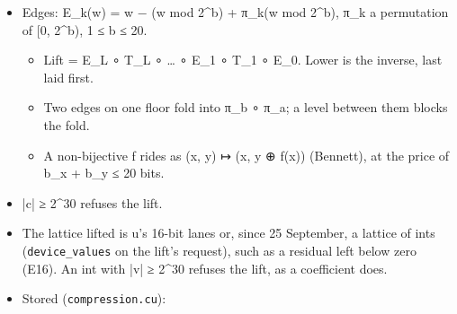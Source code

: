 \begin{itemize}
\begin{itemize}
\item target\_\allowbreak{}a ← target\_\allowbreak{}a + σ·⌊(r + Σ\_\allowbreak{}k w\_\allowbreak{}k·other\_\allowbreak{}\{a+o\_\allowbreak{}k\}) / 2\textasciicircum{}s⌋, σ = ±1, an index past either end of \texttt{other} taken at that end;
\item a ruleset R = (ρ\_\allowbreak{}1, …, ρ\_\allowbreak{}m) runs its steps in order along every line of every level. T⁻¹ runs them last first with each σ turned. A step moves only its target, reading only the other band, and every ruleset is therefore invertible exactly, whatever its weights;
\item the kernels' 5/3 is ρ\_\allowbreak{}1 = (H, σ = −1, o = (0, 1), w = (1, 1), r = 0, s = 1), then ρ\_\allowbreak{}2 = (L, σ = +1, o = (−1, 0), w = (1, 1), r = 2, s = 2);
\item two rulesets the kernels do not run are the S transform, (H, −1, (0), (1), 0, 0) then (L, +1, (0), (1), 0, 1), and a four-tap predict, (H, −1, (−1, 0, 1, 2), (−1, 9, 9, −1), 8, 4), with the 5/3's update;
\item on the record machine a weight other than ±1 is a PRODUCT by a constant, which keymath's linear forms carry (A16), and each constant is one step, laid where it is first read.
\end{itemize}
\item Edges: E\_\allowbreak{}k(w) = w − (w mod 2\textasciicircum{}b) + π\_\allowbreak{}k(w mod 2\textasciicircum{}b), π\_\allowbreak{}k a permutation of [0, 2\textasciicircum{}b), 1 ≤ b ≤ 20.

\begin{itemize}
\item Lift = E\_\allowbreak{}L ∘ T\_\allowbreak{}L ∘ … ∘ E\_\allowbreak{}1 ∘ T\_\allowbreak{}1 ∘ E\_\allowbreak{}0. Lower is the inverse, last laid first.
\item Two edges on one floor fold into π\_\allowbreak{}b ∘ π\_\allowbreak{}a; a level between them blocks the fold.
\item A non-bijective f rides as (x, y) ↦ (x, y ⊕ f(x)) (Bennett), at the price of b\_\allowbreak{}x + b\_\allowbreak{}y ≤ 20 bits.
\end{itemize}
\item |c| ≥ 2\textasciicircum{}30 refuses the lift.
\item The lattice lifted is u's 16-bit lanes or, since 25 September, a lattice of ints (\texttt{device\_\allowbreak{}values} on the lift's request), such as a residual left below zero (E16). An int with |v| ≥ 2\textasciicircum{}30 refuses the lift, as a coefficient does.
\item Stored (\texttt{compression.\allowbreak{}cu}):


\end{itemize}
